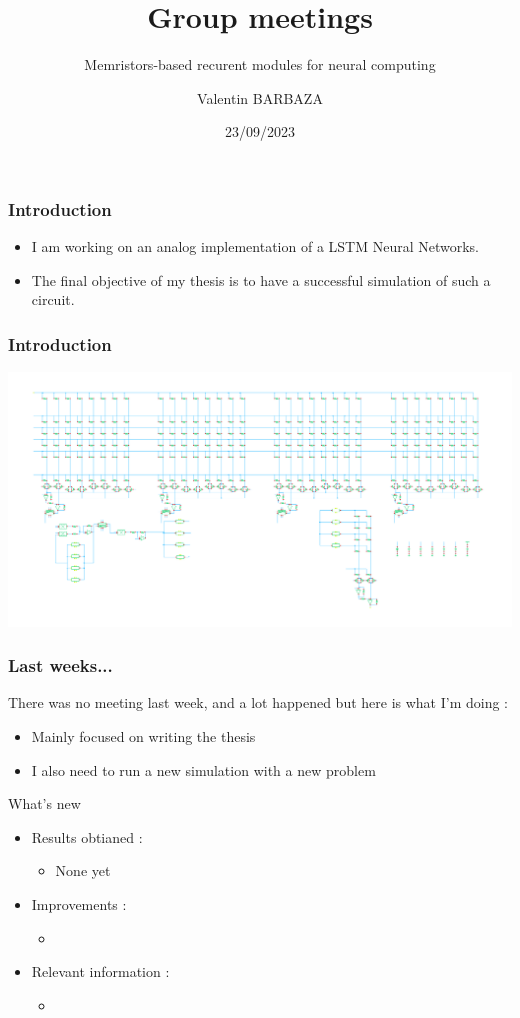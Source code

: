 \documentclass[table]{beamer}
\title{Group meetings}
\subtitle{Memristors-based recurent modules for neural computing}
\author[V. BARBAZA]{Valentin BARBAZA}
\date{23/09/2023}
\begin{document}
  \frame{\titlepage}


  \begin{frame}
    \frametitle{Introduction}

    \begin{itemize}
        \color{text}
      \item I am working on an analog implementation of a LSTM Neural Networks.
      \item The final objective of my thesis is to have a successful simulation of such a circuit.
    \end{itemize}

  \end{frame}

  \begin{frame}
    \frametitle{Introduction}
    \centering\includegraphics[width=\textwidth]{lstm/lstm-np}
  \end{frame}

  \begin{frame}
    \frametitle{Last weeks...}

    There was no meeting last week, and a lot happened but here is what I'm doing :
    \begin{itemize}
      \item Mainly focused on writing the thesis
      \item I also need to run a new simulation with a new problem
    \end{itemize}
  \end{frame}

  \begin{frame}{What's new}
    \begin{itemize}
      \item Results obtianed :
        \begin{itemize}
            \color{text}
          \item None yet
        \end{itemize}
      \item Improvements :
        \begin{itemize}
            \color{text}
          \item
        \end{itemize}
      \item Relevant information :
        \begin{itemize}
            \color{text}
          \item
        \end{itemize}
    \end{itemize}
  \end{frame}
\end{document}
